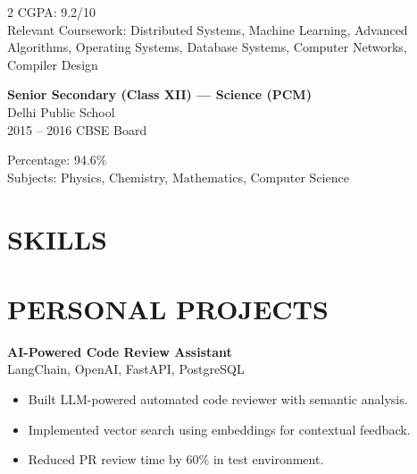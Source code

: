 \documentclass[11pt,a4paper]{article}
\newenvironment{resumelist}{
  \begin{itemize}[leftmargin=*,itemsep=2pt,topsep=1pt]
}{
  \end{itemize}
}
\begin{document}
\begin{paracol}{2}
CGPA: 9.2/10 \\
Relevant Coursework: Distributed Systems, Machine Learning, Advanced Algorithms, 
Operating Systems, Database Systems, Computer Networks, Compiler Design

\vspace{8pt}

\textbf{Senior Secondary (Class XII) — Science (PCM)} \\
Delhi Public School \\
{\color{accent} 2015 -- 2016} \hfill {\color{accent} CBSE Board}

Percentage: 94.6\% \\
Subjects: Physics, Chemistry, Mathematics, Computer Science

\vspace{8pt}



\switchcolumn

\section*{SKILLS}


\vspace{8pt}

\section*{PERSONAL PROJECTS}

\textbf{AI-Powered Code Review Assistant} \\
LangChain, OpenAI, FastAPI, PostgreSQL

\begin{resumelist}
\item Built LLM-powered automated code reviewer with semantic analysis.
\item Implemented vector search using embeddings for contextual feedback.
\item Reduced PR review time by 60\% in test environment.
\end{resumelist}


\end{paracol}
\end{document}
